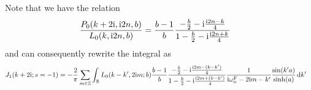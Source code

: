 \documentclass[english, parskip=full]{scrartcl}
\begin{document}
Note that we have the relation
\begin{align}
\frac{P_0(k+2\text{i}, \text{i} 2n, b)}{L_0(k,\text{i} 2n, b)} &= \frac{b-1}{b} \frac{-\frac{b}{2} - \text{i} \frac{\text{i} 2n - k}{4}}{1 - \frac{b}{2} - \text{i} \frac{\text{i} 2n + k}{4}}
\end{align}
and can consequently rewrite the integral as
\begin{align}
J_1(k+2\text{i}; s=-1) &= -\frac{2}{\pi} \sum_{m\in\mathbb{Z}} \int_{\mathbb{R}} L_0(k-k', 2\text{i} m; b) \frac{b-1}{b} \frac{-\frac{b}{2} - \text{i} \frac{\text{i} 2m - (k-k')}{4}}{1 - \frac{b}{2} - \text{i} \frac{\text{i} 2m + (k-k')}{4}} \frac{1}{\text{i}\omega_n^{\text{F}} - 2\text{i} m - k'} \frac{\sin(k'a)}{\sinh(a)} \, \mathrm{d}k'
\end{align}
\end{document}
